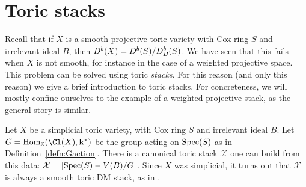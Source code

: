 \documentclass{amsart}
\begin{document}

\section{Toric stacks}
Recall that if $X$ is a smooth projective toric variety with Cox ring $S$ and irrelevant ideal $B$, then $D^b(X) = D^b(S) / D^b_B(S)$. We have seen that this fails when $X$ is not smooth, for instance in the case of a weighted projective space. This problem can be solved using toric \emph{stacks}. For this reason (and only this reason) we give a brief introduction to toric stacks. For concreteness, we will mostly confine ourselves to the example of a weighted projective stack, as the general story is similar.


Let $X$ be a simplicial toric variety, with Cox ring $S$ and irrelevant ideal $B$.  Let $G=\Hom_{\ZZ}(\Cl(X), \kk^*)$ be the group acting on $\operatorname{Spec}(S)$ as in Definition~\ref{defn:Gaction}.  There is a canonical toric stack $\mathcal X$ one can build from this data: $\mathcal X = [\operatorname{Spec}(S) - V(B) / G]$.  Since $X$ was simplicial, it turns out that $\mathcal X$ is always a smooth toric DM stack, as in \cite{BorisovChenSmith2004}.
\end{document}
